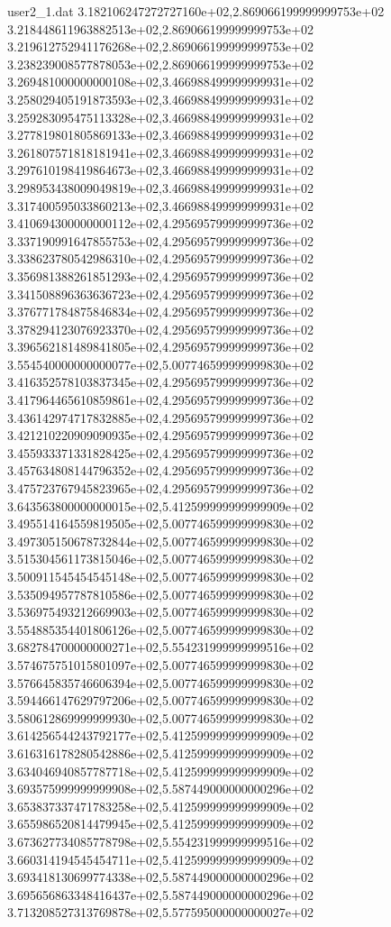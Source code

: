 \begin{filecontents}{user2_1.dat}
3.182106247272727160e+02,2.869066199999999753e+02
3.218448611963882513e+02,2.869066199999999753e+02
3.219612752941176268e+02,2.869066199999999753e+02
3.238239008577878053e+02,2.869066199999999753e+02
3.269481000000000108e+02,3.466988499999999931e+02
3.258029405191873593e+02,3.466988499999999931e+02
3.259283095475113328e+02,3.466988499999999931e+02
3.277819801805869133e+02,3.466988499999999931e+02
3.261807571818181941e+02,3.466988499999999931e+02
3.297610198419864673e+02,3.466988499999999931e+02
3.298953438009049819e+02,3.466988499999999931e+02
3.317400595033860213e+02,3.466988499999999931e+02
3.410694300000000112e+02,4.295695799999999736e+02
3.337190991647855753e+02,4.295695799999999736e+02
3.338623780542986310e+02,4.295695799999999736e+02
3.356981388261851293e+02,4.295695799999999736e+02
3.341508896363636723e+02,4.295695799999999736e+02
3.376771784875846834e+02,4.295695799999999736e+02
3.378294123076923370e+02,4.295695799999999736e+02
3.396562181489841805e+02,4.295695799999999736e+02
3.554540000000000077e+02,5.007746599999999830e+02
3.416352578103837345e+02,4.295695799999999736e+02
3.417964465610859861e+02,4.295695799999999736e+02
3.436142974717832885e+02,4.295695799999999736e+02
3.421210220909090935e+02,4.295695799999999736e+02
3.455933371331828425e+02,4.295695799999999736e+02
3.457634808144796352e+02,4.295695799999999736e+02
3.475723767945823965e+02,4.295695799999999736e+02
3.643563800000000015e+02,5.412599999999999909e+02
3.495514164559819505e+02,5.007746599999999830e+02
3.497305150678732844e+02,5.007746599999999830e+02
3.515304561173815046e+02,5.007746599999999830e+02
3.500911545454545148e+02,5.007746599999999830e+02
3.535094957787810586e+02,5.007746599999999830e+02
3.536975493212669903e+02,5.007746599999999830e+02
3.554885354401806126e+02,5.007746599999999830e+02
3.682784700000000271e+02,5.554231999999999516e+02
3.574675751015801097e+02,5.007746599999999830e+02
3.576645835746606394e+02,5.007746599999999830e+02
3.594466147629797206e+02,5.007746599999999830e+02
3.580612869999999930e+02,5.007746599999999830e+02
3.614256544243792177e+02,5.412599999999999909e+02
3.616316178280542886e+02,5.412599999999999909e+02
3.634046940857787718e+02,5.412599999999999909e+02
3.693575999999999908e+02,5.587449000000000296e+02
3.653837337471783258e+02,5.412599999999999909e+02
3.655986520814479945e+02,5.412599999999999909e+02
3.673627734085778798e+02,5.554231999999999516e+02
3.660314194545454711e+02,5.412599999999999909e+02
3.693418130699774338e+02,5.587449000000000296e+02
3.695656863348416437e+02,5.587449000000000296e+02
3.713208527313769878e+02,5.577595000000000027e+02

\end{filecontents}

